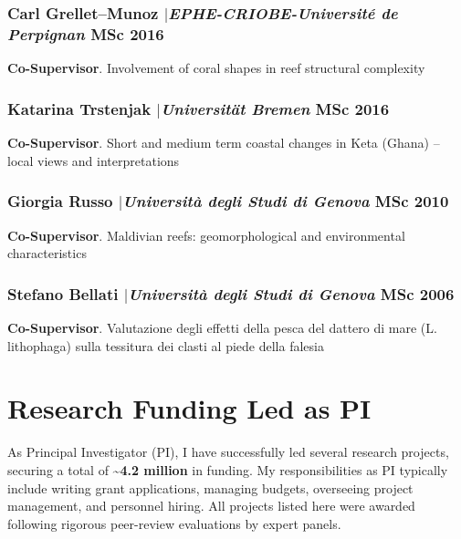 \documentclass[11pt]{article}
\begin{document}
\smallskip

\subsubsection{Carl Grellet–Munoz $|${\normalfont\textit{EPHE-CRIOBE-Université de Perpignan}} \hfill MSc 2016}
{\footnotesize 
\textbf{Co-Supervisor}. Involvement of coral shapes in reef structural complexity}

\smallskip

\subsubsection{Katarina Trstenjak $|${\normalfont\textit{Universität Bremen}} \hfill MSc 2016}
{\footnotesize 
\textbf{Co-Supervisor}. Short and medium term coastal changes in Keta (Ghana) – local views and interpretations}

\smallskip

\subsubsection{Giorgia Russo $|${\normalfont\textit{Università degli Studi di Genova}} \hfill MSc 2010}
{\footnotesize 
\textbf{Co-Supervisor}. Maldivian reefs: geomorphological and environmental characteristics}
\smallskip

\subsubsection{Stefano Bellati $|${\normalfont\textit{Università degli Studi di Genova}} \hfill MSc 2006}
{\footnotesize 
\textbf{Co-Supervisor}. Valutazione degli effetti della pesca del dattero di mare (L. lithophaga) sulla tessitura dei clasti al piede della falesia}

\newpage

\section{Research Funding Led as PI}
{\normalfont As Principal Investigator (PI), I have successfully led several research projects, securing a total of  \textbf{\textasciitilde4.2 million \texteuro} in funding. My responsibilities as PI typically include writing grant applications, managing budgets, overseeing project management, and personnel hiring. All projects listed here were awarded following rigorous peer-review evaluations by expert panels.}\\
\end{document}
